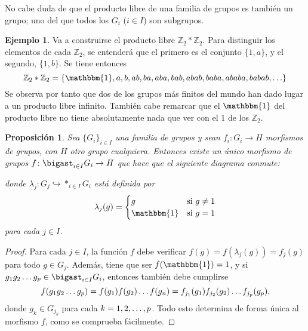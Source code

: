 \documentclass[11pt]{report}
\newtheorem{proposition}{Proposición}[chapter]
\theoremstyle{definition}
\theoremstyle{definition}
\newtheorem{example}{Ejemplo}[chapter]
\theoremstyle{remark}
\newcommand{\Z}{\mathbb Z}
\begin{document}
\vspace{2mm}

No cabe duda de que el producto libre de una familia de grupos es también un grupo; uno del que todos los $G_i$ ($i \in I$) son subgrupos.

\begin{example}
Va a construirse el producto libre $\Z_2 \ast \Z_2$. Para distinguir los elementos de cada $\Z_2$, se entenderá que el primero es el conjunto $\{1,a\}$, y el segundo, $\{1,b\}$. Se tiene entonces
\[\Z_2 \ast \Z_2 = \{\mathbbm{1},a,b,ab,ba,aba,bab,abab,baba,ababa,babab,\mathellipsis\}\]
Se observa por tanto que dos de los grupos más finitos del mundo han dado lugar a un producto libre infinito. También cabe remarcar que el $\mathbbm{1}$ del producto libre no tiene absolutamente nada que ver con el $1$ de los $\Z_2$.
\end{example}

\begin{proposition}
\label{prop3.1.}
Sea $\{G_i\}_{i \in I}$ una familia de grupos y sean $f_i \colon G_i \to H$ morfismos de grupos, con $H$ otro grupo cualquiera. Entonces existe un único morfismo de grupos $f \colon \bigast_{i \in I}G_{i} \to H$ que hace que el siguiente diagrama conmute:
\begin{center}
\end{center}
donde $\lambda_j \colon G_j \hookrightarrow \ast_{i \in I}G_i$ está definida por
\[\lambda_j(g) = \begin{cases}
    g & $si$ \ g \neq 1 \\
    \mathbbm{1} & $si$ \ g = 1
\end{cases}\]
para cada $j \in I$.
\end{proposition}

\begin{proof}
Para cada $j \in I$, la función $f$ debe verificar $f(g) = f(\lambda_j (g)) =  f_j(g)$ para todo $g \in G_j$. Además, tiene que ser $f(\mathbbm{1}) = 1$, y si $g_1g_2\mathellipsis g_p \in \bigast_{i \in I} G_i$, entonces también debe cumplirse
\[f(g_1 g_2 \mathellipsis g_p) = f(g_1) f(g_2) \mathellipsis f(g_n) = f_{j_1}(g_1) f_{j_2}(g_2) \mathellipsis f_{j_p}(g_p),\]
donde $g_k \in G_{j_k}$ para cada $k = 1,2,\mathellipsis,p$. Todo esto determina de forma única al morfismo $f$, como se comprueba fácilmente.
\end{proof}
\end{document}

